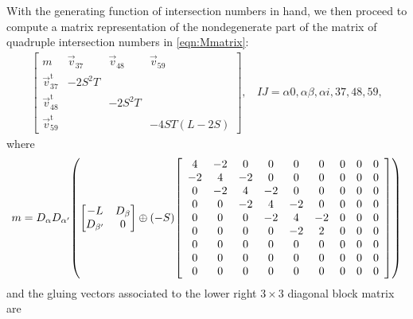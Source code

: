 \documentclass[11pt,oneside,english]{article}
\numberwithin{equation}{section}
\let\originalleft\left
\let\originalright\right
\renewcommand*{\left}{\mathopen{}\mathclose\bgroup\originalleft}
\renewcommand*{\right}{\aftergroup\egroup\originalright}
\theoremstyle{definition}
\begin{document}
With the generating function of intersection numbers in hand, we then proceed to compute a matrix representation of the nondegenerate part of the matrix of quadruple intersection numbers in \cref{eqn:Mmatrix}:
	\begin{align}
		\begin{bmatrix} m & \vec v_{37} & \vec v_{48} & \vec v_{59} \\
		\vec v_{37}^{\mathrm t} & -2 S^2 T & & \\
		\vec v_{48}^{\mathrm t} &&-2 S^2 T& \\
		\vec v_{59}^{\mathrm t} &&& - 4 S T (L- 2 S)
		\end{bmatrix},~~~~IJ = \alpha 0, \alpha \beta ,\alpha i, 37,48,59,
	\end{align}
where 
	\begin{align}
		m =  D_\alpha D_{\alpha'}\left(  \begin{bmatrix} - L & D_\beta \\
		 D_{\beta'} &0 \end{bmatrix} \oplus (-S)\begin{bmatrix}
\begin{array}{ccccccccc}
 4 & -2 & 0 & 0 & 0 & 0 & 0 & 0 & 0 \\
 -2 & 4 & -2 & 0 & 0 & 0 & 0 & 0 & 0 \\
 0 & -2 & 4 & -2 & 0 & 0 & 0 & 0 & 0 \\
 0 & 0 & -2 & 4 & -2 & 0 & 0 & 0 & 0 \\
 0 & 0 & 0 & -2 & 4 & -2 & 0 & 0 & 0 \\
 0 & 0 & 0 & 0 & -2 & 2 & 0 & 0 & 0 \\
 0 & 0 & 0 & 0 & 0 & 0 & 0 & 0 & 0 \\
 0 & 0 & 0 & 0 & 0 & 0 & 0 & 0 & 0 \\
 0 & 0 & 0 & 0 & 0 & 0 & 0 & 0 & 0 \\
\end{array}
\end{bmatrix}  \right)
	\end{align}
and the gluing vectors associated to the lower right $3 \times 3$ diagonal block matrix are
\end{document}
